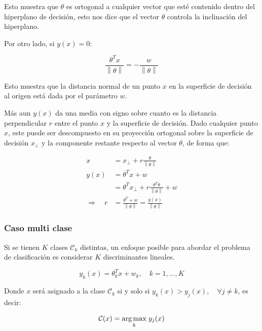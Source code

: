 Esto muestra que $\theta$ es ortogonal a cualquier vector que esté contenido dentro del hiperplano de decisión, esto nos dice que el vector $\theta$ controla la inclinación del hiperplano.

Por otro lado, si $y(x)=0$:

\begin{equation}
    \frac{\theta^Tx}{\left \| \theta \right \|} = -\frac{w}{\left \| \theta \right \|}
\end{equation}

Esto muestra que la distancia normal de un punto $x$ en la superficie de decisión al origen está dada por el parámetro $w$.

Más aun $y(x)$ da una media con signo sobre cuanto es la distancia perpendicular $r$ entre el punto $x$ y la superficie de decisión. Dado cualquier punto $x$, este puede ser descompuesto en su proyección ortogonal sobre la superficie de decisión $x_{\bot}$ y la componente restante respecto al vector $\theta$, de forma que:

\begin{align}
    x &= x_{\bot}+r\frac{\theta}{\left \| \theta \right \|}\\
    y(x) &= \theta^Tx+w\\
    &= \theta^Tx_{\bot} + r\frac{\theta^T\theta}{\left \| \theta \right \|} + w\\
    \Rightarrow \quad r &= \frac{\theta^T+w}{\left \| \theta \right \|} 
    = \frac{y(x)}{\left \| \theta \right \|}
\end{align}

\newpage
\subsubsection{Caso multi clase}

Si se tienen $K$ clases $\mathcal{C}_k$ distintas, un enfoque posible para abordar el problema de clasificación es considerar $K$ discriminantes lineales.

\begin{equation}
    y_k(x) = \theta_k^Tx + w_k, \quad k=1,\ldots,K
\end{equation}

Donde $x$ será asignado a la clase $\mathcal{C}_k$ si y solo si $y_k(x) > y_j(x),\quad \forall j\neq k$, es decir:

\begin{equation}
    \mathcal{C}(x) = \underset{k}{\operatorname*{arg\,max}}\hspace{1mm} y_j(x)
\end{equation}

